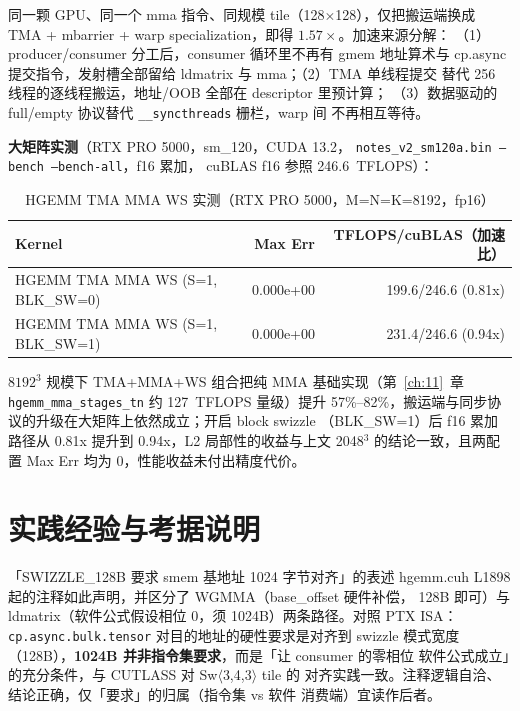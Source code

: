 同一颗 GPU、同一个 mma 指令、同规模 tile（128$\times$128），仅把搬运端换成
TMA + mbarrier + warp specialization，即得 $1.57\times$。加速来源分解：
（1）producer/consumer 分工后，consumer 循环里不再有 gmem 地址算术与
cp.async 提交指令，发射槽全部留给 ldmatrix 与 mma；（2）TMA 单线程提交
替代 256 线程的逐线程搬运，地址/OOB 全部在 descriptor 里预计算；
（3）数据驱动的 full/empty 协议替代 \texttt{\_\allowbreak{}\_\allowbreak{}syncthreads} 栅栏，warp 间
不再相互等待。

\textbf{大矩阵实测}（RTX PRO 5000，sm\_120，CUDA 13.2，
\texttt{notes\_\allowbreak{}v2\_\allowbreak{}sm120a.\allowbreak{}bin\allowbreak{} --bench\allowbreak{} --bench-all}，f16 累加，
cuBLAS f16 参照 246.6~TFLOPS）：

\begin{table}[H]
\centering
\caption{HGEMM TMA MMA WS 实测（RTX PRO 5000，M=N=K=8192，fp16）}
\label{tab:ch14-perf}
\small
\begin{tabular}{lrr}
\toprule
Kernel & Max Err & TFLOPS/cuBLAS（加速比） \\
\midrule
HGEMM TMA MMA WS (S=1, BLK\_SW=0) & 0.000e+00 & 199.6/246.6 (0.81x) \\
HGEMM TMA MMA WS (S=1, BLK\_SW=1) & 0.000e+00 & 231.4/246.6 (0.94x) \\
\bottomrule
\end{tabular}
\end{table}

$8192^3$ 规模下 TMA+MMA+WS 组合把纯 MMA 基础实现（第~\ref{ch:11}~章
\texttt{hgemm\_\allowbreak{}mma\_\allowbreak{}stages\_\allowbreak{}tn} 约 127~TFLOPS 量级）提升
57\%--82\%，搬运端与同步协议的升级在大矩阵上依然成立；开启 block swizzle
（BLK\_SW=1）后 f16 累加路径从 0.81x 提升到 0.94x，L2 局部性的收益与上文
2048$^3$ 的结论一致，且两配置 Max Err 均为 0，性能收益未付出精度代价。

\section{实践经验与考据说明}

\begin{kaogu}[F2 核校通过]{「SWIZZLE\_128B 要求 smem 基地址 1024 字节对齐」的表述}
  hgemm.cuh L1898 起的注释如此声明，并区分了 WGMMA（base\_offset 硬件补偿，
  128B 即可）与 ldmatrix（软件公式假设相位 0，须 1024B）两条路径。对照 PTX
  ISA：\texttt{cp.\allowbreak{}async.\allowbreak{}bulk.\allowbreak{}tensor} 对目的地址的硬性要求是对齐到 swizzle
  模式宽度（128B），\textbf{1024B 并非指令集要求}，而是「让 consumer 的零相位
  软件公式成立」的充分条件，与 CUTLASS 对 Sw$\langle$3,4,3$\rangle$ tile 的
  对齐实践一致。注释逻辑自洽、结论正确，仅「要求」的归属（指令集 vs 软件
  消费端）宜读作后者。
\end{kaogu}

